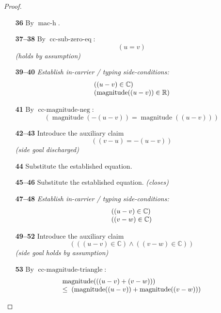 \documentclass[11pt]{article}
\theoremstyle{plain}
\begin{document}
\begin{proof}
\begin{itemize}[leftmargin=2.8em, itemsep=4pt, parsep=1pt]
  \item[\textbf{36}] By $\operatorname{mac\text{-}h}$.
  \item[\textbf{37--38}] By $\operatorname{cc\text{-}sub\text{-}zero\text{-}eq}$:
\begin{equation*}
(u = v)
\end{equation*}
  \emph{(holds by assumption)}
  \item[\textbf{39--40}] \emph{Establish in-carrier / typing side-conditions:}
\begin{equation*}
\begin{array}{@{}l@{}}
((u - v) \in \mathbb{C}) \\
(\operatorname{magnitude}((u - v)) \in \mathbb{R})
\end{array}
\end{equation*}

  \item[\textbf{41}] By $\operatorname{cc\text{-}magnitude\text{-}neg}$:
\begin{equation*}
(\operatorname{magnitude}(-(u - v)) = \operatorname{magnitude}((u - v)))
\end{equation*}

  \item[\textbf{42--43}] Introduce the auxiliary claim
\begin{equation*}
((v - u) = -(u - v))
\end{equation*}
  \emph{(side goal discharged)}
  \item[\textbf{44}] Substitute the established equation.
  \item[\textbf{45--46}] Substitute the established equation.  \emph{(closes)}
  \item[\textbf{47--48}] \emph{Establish in-carrier / typing side-conditions:}
\begin{equation*}
\begin{array}{@{}l@{}}
((u - v) \in \mathbb{C}) \\
((v - w) \in \mathbb{C})
\end{array}
\end{equation*}

  \item[\textbf{49--52}] Introduce the auxiliary claim
\begin{equation*}
(((u - v) \in \mathbb{C}) \wedge ((v - w) \in \mathbb{C}))
\end{equation*}
  \emph{(side goal holds by assumption)}
  \item[\textbf{53}] By $\operatorname{cc\text{-}magnitude\text{-}triangle}$:
\begin{equation*}
\begin{array}{@{}l@{}} \operatorname{magnitude}(((u - v) + (v - w))) \\ \leq\; (\operatorname{magnitude}((u - v)) + \operatorname{magnitude}((v - w))) \end{array}
\end{equation*}


\end{itemize}
\end{proof}
\end{document}
